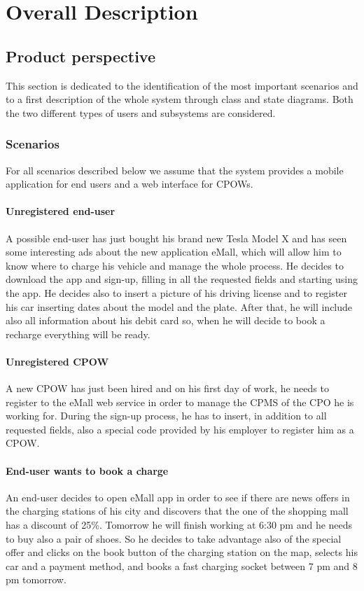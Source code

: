 \documentclass[a4paper]{report}
\begin{document}
\chapter{Overall Description}
\section{Product perspective}
This section is dedicated to the identification of the most important scenarios and to a first description of the whole system through class and state diagrams. Both the two different types of users and subsystems are considered.
\subsection{Scenarios}
For all scenarios described below we assume that the system provides a mobile application for end users and a web interface for CPOWs.
\subsubsection{Unregistered end-user}
A possible end-user has just bought his brand new Tesla Model X and has seen some interesting ads about the new application eMall, which will allow him to know where to charge his vehicle and manage the whole process. He decides to download the app and sign-up, filling in all the requested fields and starting using the app. He decides also to insert a picture of his driving license and to register his car inserting dates about the model and the plate. After that, he will include also all information about his debit card so, when he will decide to book a recharge everything will be ready.

\subsubsection{Unregistered CPOW}
A new CPOW has just been hired and on his first day of work, he needs to register to the eMall web service in order to manage the CPMS of the CPO he is working for. During the sign-up process, he has to insert, in addition to all requested fields, also a special code provided by his employer to register him as a CPOW.

\subsubsection{End-user wants to book a charge}
An end-user decides to open eMall app in order to see if there are news offers in the charging stations of his city and discovers that the one of the shopping mall has a discount of 25\%. Tomorrow he will finish working at 6:30 pm and he needs to buy also a pair of shoes. So he decides to take advantage also of the special offer and clicks on the book button of the charging station on the map, selects his car and a payment method, and books a fast charging socket between 7 pm and 8 pm tomorrow.
\end{document}
